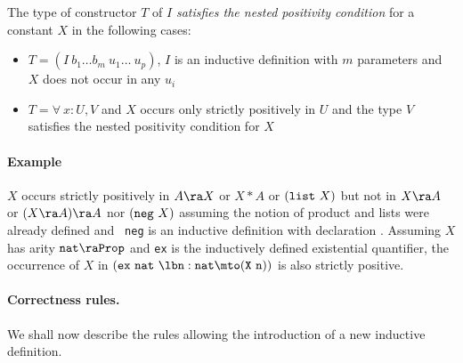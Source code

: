 The type of constructor $T$ of $I$ {\em satisfies the nested
positivity condition} for a constant $X$ in the following
cases:

\begin{itemize}
\item $T=(I~b_1\ldots b_m~u_1\ldots ~u_{p})$, $I$ is an inductive
  definition with $m$ parameters and $X$ does not occur in
any $u_i$
\item $T=\forall~x:U,V$ and $X$ occurs only strictly positively in $U$ and
the type $V$ satisfies the nested positivity condition for $X$
\end{itemize}

\paragraph{Example}

$X$ occurs strictly positively in $A\ra X$ or $X*A$ or $({\tt list}~
X)$ but not in $X \ra A$ or $(X \ra A)\ra A$ nor $({\tt neg}~X)$
assuming the notion of product and lists were already defined and {\tt
  neg} is an inductive definition with declaration .  Assuming
$X$ has arity ${\tt nat \ra Prop}$ and {\tt ex} is the inductively
defined existential quantifier, the occurrence of $X$ in ${\tt (ex~
  nat~ \lb n:nat\mto (X~ n))}$ is also strictly positive.

\paragraph{Correctness rules.}
We shall now describe the rules allowing the introduction of a new
inductive definition.

